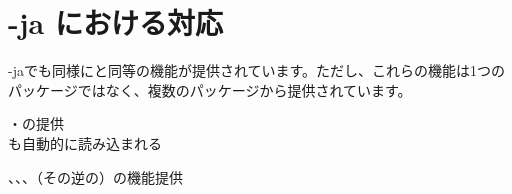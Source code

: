 \documentclass[../supplement]{subfiles}
\begin{document}
\section{\LuaTeX -ja における対応}

\LuaTeX -jaでも同様にと同等の機能が提供されています。ただし、これらの機能は1つのパッケージではなく、複数のパッケージから提供されています。

\begin{description}[font=\sffamily, itemindent=-8zw, leftmargin=10zw]
  \item[luatexja-otf] \tabto{0pt}・の提供\\
    も自動的に読み込まれる
  \item[luatexja-preset] \tabto{0pt}、、、（その逆の）の機能提供
\end{description}
\end{document}
